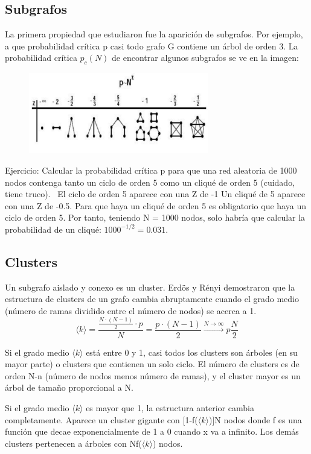 \subsection{Subgrafos}
La primera propiedad que estudiaron fue la aparición de subgrafos. Por ejemplo, a que probabilidad crítica p casi todo grafo G contiene un árbol de orden 3. 
La probabilidad crítica $p_c(N)$ de encontrar algunos subgrafos se ve en la imagen:
\begin{figure}
\centering
\includegraphics[width = 0.7\textwidth]{figs/prob-critica.png}
\end{figure}

Ejercicio: Calcular la probabilidad crítica p para que una red aleatoria de 1000 nodos contenga tanto un ciclo de orden 5 como un cliqué de orden 5 (cuidado, tiene truco).
 \
El ciclo de orden 5 aparece con una Z de -1
Un cliqué de 5 aparece con una Z de -0.5. 
Para que haya un cliqué de orden 5 es obligatorio que haya un ciclo de orden 5. Por tanto, teniendo N = 1000 nodos, solo habría que calcular la probabilidad de un cliqué: $1000^{-1/2} = 0.031$.

\subsection{Clusters}
Un subgrafo aislado y conexo es un cluster. Erdös y Rényi demostraron que la estructura de clusters de un grafo cambia abruptamente cuando el grado medio (número de ramas dividido entre el número de nodos) se acerca a 1.
$$\langle k \rangle = \frac{\frac{N \cdot (N-1)}{2} \cdot p}{N} = \frac{p \cdot (N-1)}{2} \xrightarrow{N \to \infty} p\frac{N}{2}$$

Si el grado medio $\langle k \rangle$ está entre 0 y 1, casi todos los clusters son árboles (en su mayor parte) o clusters que contienen un solo ciclo. El número de clusters es de orden N-n (número de nodos menos número de ramas), y el cluster mayor es un árbol de tamaño proporcional a N. 

Si el grado medio $\langle k \rangle$ es mayor que 1, la estructura anterior cambia completamente. Aparece un cluster gigante con [1-f($\langle k \rangle$)]N nodos donde f es una función que decae exponencialmente de 1 a 0 cuando x va a infinito. Los demás clusters pertenecen a árboles con Nf($\langle k \rangle$) nodos.

